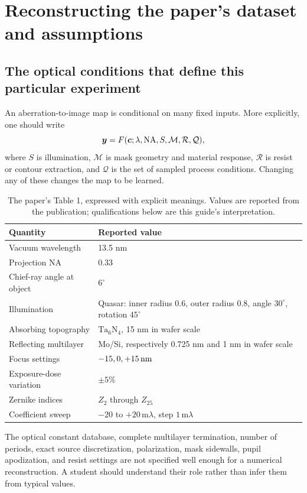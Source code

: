 \chapter{Reconstructing the paper's dataset and assumptions}\label{ch:data}

\section{The optical conditions that define this particular experiment}
An aberration-to-image map is conditional on many fixed inputs.
More explicitly, one should write
\[
\bm{y}=F(\bm{c};\lambda,\mathrm{NA},S,\mathcal M,\mathcal R,\mathcal Q),
\]
where $S$ is illumination, $\mathcal M$ is mask geometry and material
response, $\mathcal R$ is resist or contour extraction, and
$\mathcal Q$ is the set of sampled process conditions.
Changing any of these changes the map to be learned.

\begin{table}[htbp]\centering\small
\caption{The paper's Table 1, expressed with explicit meanings.
Values are reported from the publication; qualifications below are this
guide's interpretation.}
\begin{tabularx}{\textwidth}{@{}p{}Y@{}}
\toprule Quantity & Reported value\\ \midrule
Vacuum wavelength & 13.5 nm\\
Projection NA & 0.33\\
Chief-ray angle at object & $6^\circ$\\
Illumination & Quasar: inner radius 0.6, outer radius 0.8,
angle $30^\circ$, rotation $45^\circ$\\
Absorbing topography & $\mathrm{Ta}_6\mathrm{N}_4$,
15 nm in wafer scale\\
Reflecting multilayer & Mo/Si, respectively 0.725 nm and 1 nm
in wafer scale\\
Focus settings & $-15,0,+15\,\mathrm{nm}$\\
Exposure-dose variation & $\pm5\%$\\
Zernike indices & $Z_2$ through $Z_{25}$\\
Coefficient sweep & $-20$ to $+20\,\mathrm{m}\lambda$,
step $1\,\mathrm{m}\lambda$\\
\bottomrule
\end{tabularx}
\end{table}

The optical constant database, complete multilayer termination,
number of periods, exact source discretization, polarization,
mask sidewalls, pupil apodization, and resist settings are not specified
well enough for a numerical reconstruction. A student should understand
their role rather than infer them from typical values.

